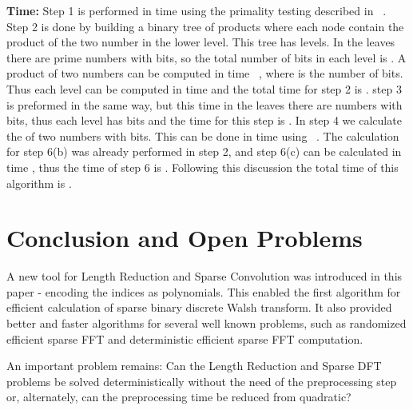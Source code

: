 \documentclass[11pt,amssymb]{article}
\begin{document}
{\bf Time:} Step 1 is performed in time 
using the primality testing described in ~\cite{berri:02}. Step 2 is
done by building a binary tree of products where each node
contain the product of the two number in the lower level. This
tree has  levels. In the leaves there are  prime
numbers with  bits, so the total number of bits in each
level is . A product of two numbers can be
computed in time  ~\cite{SS-71}, where  is
the number of bits. Thus each level can be computed in time  and the total time for step 2 is . step 3 is preformed in the same way, but this time
in the leaves there are  numbers with  bits, thus each
level has  bits and the time for this step is . In step 4 we calculate the  of two numbers with  bits. This can be done in time 
using ~\cite{SZ:02}. The calculation for step 6(b) was
already performed in step 2, and step 6(c) can be calculated in time
, thus the time of step 6 is . Following this discussion the total time of this
algorithm is .



\section{Conclusion and Open Problems}\label{s:conc}

A new tool for Length Reduction and Sparse Convolution was introduced
in this paper - encoding the indices as polynomials. This enabled the
first algorithm for efficient calculation of sparse binary discrete
Walsh transform. It also provided better and faster algorithms for
several well known problems, such as randomized efficient sparse FFT
and deterministic efficient sparse FFT computation.

An important problem remains: Can the Length Reduction and Sparse
DFT problems be solved deterministically without the need of the
preprocessing step or, alternately, can the preprocessing time be
reduced from quadratic?


\small{

}
\end{document}
